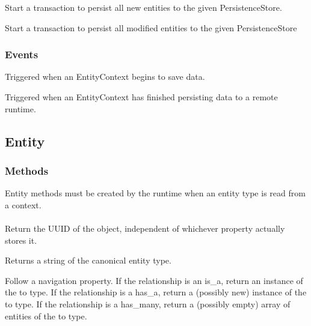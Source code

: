 \documentclass{article}
\begin{document}
	{Start a transaction to persist all new entities to the given
		PersistenceStore.}
	{
	}

	{Start a transaction to persist all modified entities to the given
		PersistenceStore}
	{
	}

\subsubsection{Events}
	{Triggered when an EntityContext begins to save data.}
	{}

	{Triggered when an EntityContext has finished persisting data to a remote
	runtime.}
	{}

\subsection{Entity}
\subsubsection{Methods}
Entity methods must be created by the runtime when an entity type is read from a
context.
\\
\\
	{Return the UUID of the object, independent of whichever property
	actually stores it.}
	{
	}

	{Returns a string of the canonical entity type.}
	{
	}

	{Follow a navigation property. If the relationship is an {\ilcode is\_a},
	return an instance of the {\ilcode to} type. If the relationship is a
	{\ilcode has\_a}, return a (possibly new) instance of the {\ilcode to} type.
	If the relationship is a {\ilcode has\_many}, return a (possibly empty)
	array of entities of the {\ilcode to} type.}
	{
	}
\end{document}

